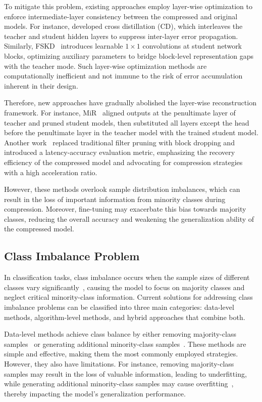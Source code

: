 \documentclass[twoside,11pt]{article}
\begin{document}
To mitigate this problem, existing approaches employ layer-wise optimization to enforce intermediate-layer consistency between the compressed and original models. For instance, \citet{bai2020few} developed cross distillation (CD), which interleaves the teacher and student hidden layers to suppress inter-layer error propagation. Similarly, FSKD~\citep{li2020few} introduces learnable 
$1 \times 1$ convolutions at student network blocks, optimizing auxiliary parameters to bridge block-level representation gaps with the teacher mode. Such layer-wise optimization methods are computationally inefficient and not immune to the risk of error accumulation inherent in their design. 

Therefore, new approaches have gradually abolished the layer-wise reconstruction framework. For instance, MiR~\citep{wang2022mir} aligned outputs at the penultimate layer of teacher and pruned student models, then substituted all layers except the head before the penultimate layer in the teacher model with the trained student model. Another work~\citep{wang2023practical} replaced traditional filter pruning with block dropping and introduced a latency-accuracy evaluation metric, emphasizing the recovery efficiency of the compressed model and advocating for compression strategies with a high acceleration ratio. 

However, these methods overlook sample distribution imbalances, which can result in the loss of important information from minority classes during compression. Moreover, fine-tuning may exacerbate this bias towards majority classes, reducing the overall accuracy and weakening the generalization ability of the compressed model.


\subsection{Class Imbalance Problem}
In classification tasks, class imbalance occurs when the sample sizes of different classes vary significantly~\citep{ochal2023few}, causing the model to focus on majority classes and neglect critical minority-class information. Current solutions for addressing class imbalance problems can be classified into three main categories: data-level methods, algorithm-level methods, and hybrid approaches that combine both.

Data-level methods achieve class balance by either removing majority-class samples~\citep{liu2008exploratory,lin2017clustering,mohammed2020machine} or generating additional minority-class samples~\citep{chawla2002smote,sharma2022review,abdi2015combat}. These methods are simple and effective, making them the most commonly employed strategies. However, they also have limitations. For instance, removing majority-class samples may result in the loss of valuable information, leading to underfitting, while generating additional minority-class samples may cause overfitting~\citep{zhou2020bbn}, thereby impacting the model's generalization performance. 
\end{document}
